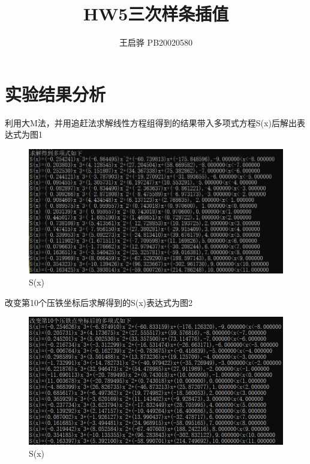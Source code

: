 \documentclass{article}
\title{\songti \zihao{2}\bfseries HW5三次样条插值}
\author{王启骅 PB20020580}
\begin{document}
	\maketitle
	\section{实验结果分析}
	利用大M法，并用追赶法求解线性方程组得到的结果带入多项式方程S(x)后解出表达式为图1
		\begin{figure}[!h]
		
		\centering
		\includegraphics[scale=1]{Sx}
		\caption{\heiti{}S(x)}
		
	\end{figure}
	
	
	改变第10个压铁坐标后求解得到的S(x)表达式为图2
		\begin{figure}[!h]
		
		\centering
		\includegraphics[scale=1]{Sx_1}
		\caption{\heiti{}S(x)}
		
	\end{figure}
\end{document}
